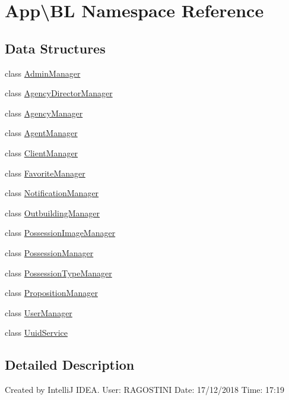 \hypertarget{namespace_app_1_1_b_l}{}\section{App\textbackslash{}BL Namespace Reference}
\label{namespace_app_1_1_b_l}
\subsection*{Data Structures}
\begin{DoxyCompactItemize}
\item 
class \mbox{\hyperlink{class_app_1_1_b_l_1_1_admin_manager}{Admin\+Manager}}
\item 
class \mbox{\hyperlink{class_app_1_1_b_l_1_1_agency_director_manager}{Agency\+Director\+Manager}}
\item 
class \mbox{\hyperlink{class_app_1_1_b_l_1_1_agency_manager}{Agency\+Manager}}
\item 
class \mbox{\hyperlink{class_app_1_1_b_l_1_1_agent_manager}{Agent\+Manager}}
\item 
class \mbox{\hyperlink{class_app_1_1_b_l_1_1_client_manager}{Client\+Manager}}
\item 
class \mbox{\hyperlink{class_app_1_1_b_l_1_1_favorite_manager}{Favorite\+Manager}}
\item 
class \mbox{\hyperlink{class_app_1_1_b_l_1_1_notification_manager}{Notification\+Manager}}
\item 
class \mbox{\hyperlink{class_app_1_1_b_l_1_1_outbuilding_manager}{Outbuilding\+Manager}}
\item 
class \mbox{\hyperlink{class_app_1_1_b_l_1_1_possession_image_manager}{Possession\+Image\+Manager}}
\item 
class \mbox{\hyperlink{class_app_1_1_b_l_1_1_possession_manager}{Possession\+Manager}}
\item 
class \mbox{\hyperlink{class_app_1_1_b_l_1_1_possession_type_manager}{Possession\+Type\+Manager}}
\item 
class \mbox{\hyperlink{class_app_1_1_b_l_1_1_proposition_manager}{Proposition\+Manager}}
\item 
class \mbox{\hyperlink{class_app_1_1_b_l_1_1_user_manager}{User\+Manager}}
\item 
class \mbox{\hyperlink{class_app_1_1_b_l_1_1_uuid_service}{Uuid\+Service}}
\end{DoxyCompactItemize}


\subsection{Detailed Description}
Created by IntelliJ I\+D\+EA. User\+: R\+A\+G\+O\+S\+T\+I\+NI Date\+: 17/12/2018 Time\+: 17\+:19

